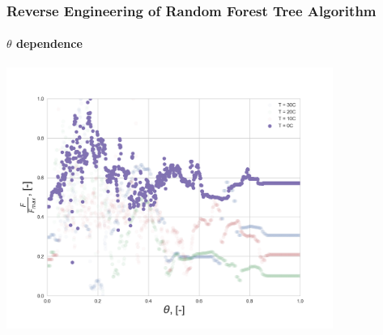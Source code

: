 \documentclass{beamer}
\begin{document}
\begin{frame}
\frametitle{Reverse Engineering of Random Forest Tree Algorithm}
\framesubtitle{$\theta$ dependence}

\centering
\includegraphics[width=0.8\textwidth]{Theta_dependence_0.png}

\end{frame}
\end{document}
